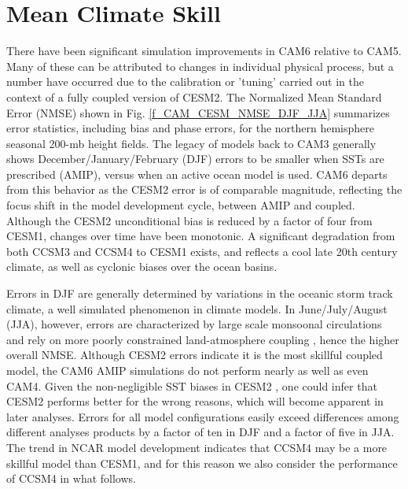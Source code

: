 \section{Mean Climate Skill}
\label{sec:climate}

There have been significant simulation improvements in CAM6 relative to CAM5. Many of these can be attributed to changes in individual physical process, but a number have occurred due to the calibration or 'tuning' carried out in the context of a fully coupled version of CESM2. The Normalized Mean Standard Error (NMSE) shown in Fig. \ref{f_CAM_CESM_NMSE_DJF_JJA} summarizes error statistics, including bias and phase errors, for the northern hemisphere seasonal 200-mb height fields. The legacy of models back to CAM3 \citep{Collins2006} generally shows December/January/February (DJF) errors to be smaller when SSTs are prescribed (AMIP), versus when an active ocean model is used. CAM6 departs from this behavior as the CESM2 error is of comparable magnitude, reflecting the focus shift in the model development cycle, between AMIP and coupled. Although the CESM2 unconditional bias is reduced by a factor of four from CESM1, changes over time have been monotonic. A significant degradation from both CCSM3 \citep{Collins2006} and CCSM4 \citep{Gent2011} to CESM1 exists, and reflects a cool late 20th century climate, as well as cyclonic biases over the ocean basins. 

Errors in DJF are generally determined by variations in the oceanic storm track climate, a well simulated phenomenon in climate models. In June/July/August (JJA), however, errors are characterized by large scale monsoonal circulations and rely on more poorly constrained land-atmosphere coupling \citep{Dirmeyer2006}, hence the higher overall NMSE. Although CESM2 errors indicate it is the most skillful coupled model, the CAM6 AMIP simulations do not perform nearly as well as even CAM4. Given the non-negligible SST biases in CESM2 \citep{Danabasoglu2020}, one could infer that CESM2 performs better for the wrong reasons, which will become apparent in later analyses. Errors for all model configurations easily exceed differences among different analyses products by a factor of ten in DJF and a factor of five in JJA. The trend in NCAR model development indicates that CCSM4 may be a more skillful model than CESM1, and for this reason we also consider the performance of CCSM4 in what follows.

